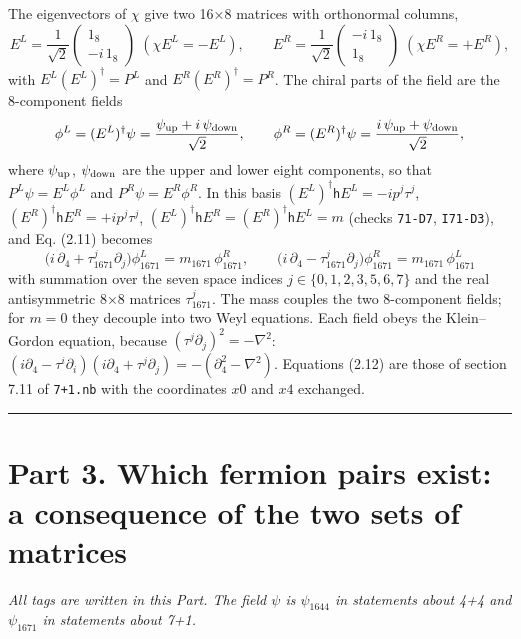 \documentclass[
  10pt,
]{article}
\begin{document}
The eigenvectors of \(\chi\) give two 16×8 matrices with orthonormal
columns,
\[E^{L}=\frac1{\sqrt2}\begin{pmatrix}1_8\\-i\,1_8\end{pmatrix}\;(\chi E^{L}=-E^{L}),\qquad
E^{R}=\frac1{\sqrt2}\begin{pmatrix}-i\,1_8\\1_8\end{pmatrix}\;(\chi E^{R}=+E^{R}),\]
with \(E^{L}(E^{L})^\dagger=P^{L}\) and \(E^{R}(E^{R})^\dagger=P^{R}\).
The chiral parts of the field are the 8-component fields
\[\phi^{L}=(E^{L})^\dagger\psi=\frac{\psi_{\rm up}+i\,\psi_{\rm down}}{\sqrt2},\qquad\phi^{R}=(E^{R})^\dagger\psi=\frac{i\,\psi_{\rm up}+\psi_{\rm down}}{\sqrt2},\]
where \(\psi_{\rm up}\), \(\psi_{\rm down}\) are the upper and lower
eight components, so that \(P^{L}\psi=E^{L}\phi^{L}\) and
\(P^{R}\psi=E^{R}\phi^{R}\). In this basis
\((E^{L})^\dagger\mathsf{h}E^{L}=-ip^j\tau^j\),
\((E^{R})^\dagger\mathsf{h}E^{R}=+ip^j\tau^j\),
\((E^{L})^\dagger\mathsf{h}E^{R}=(E^{R})^\dagger\mathsf{h}E^{L}=m\)
(checks \texttt{71-D7}, \texttt{I71-D3}), and Eq. (2.11) becomes
\[\boxed{\;\big(i\,\partial_4+\tau_{1671}^j\partial_j\big)\phi_{1671}^{L}=m_{1671}\,\phi_{1671}^{R},\qquad\big(i\,\partial_4-\tau_{1671}^j\partial_j\big)\phi_{1671}^{R}=m_{1671}\,\phi_{1671}^{L}\;}\tag{2.12}\]
with summation over the seven space indices \(j\in\{0,1,2,3,5,6,7\}\)
and the real antisymmetric 8×8 matrices \(\tau_{1671}^j\). The mass
couples the two 8-component fields; for \(m=0\) they decouple into two
Weyl equations. Each field obeys the Klein--Gordon equation, because
\((\tau^j\partial_j)^2=-\nabla^2\):
\((i\partial_4-\tau^i\partial_i)(i\partial_4+\tau^j\partial_j)=-(\partial_4^2-\nabla^2)\).
Equations (2.12) are those of section 7.11 of \texttt{7+1.nb} with the
coordinates \(x0\) and \(x4\) exchanged.

\begin{center}\rule{0.5\linewidth}{0.5pt}\end{center}

\hypertarget{part-3.-which-fermion-pairs-exist-a-consequence-of-the-two-sets-of-matrices}{%
\section{Part 3. Which fermion pairs exist: a consequence of the two
sets of
matrices}\label{part-3.-which-fermion-pairs-exist-a-consequence-of-the-two-sets-of-matrices}}

\emph{All tags are written in this Part. The field \(\psi\) is
\(\psi_{1644}\) in statements about 4+4 and \(\psi_{1671}\) in
statements about 7+1.}
\end{document}
